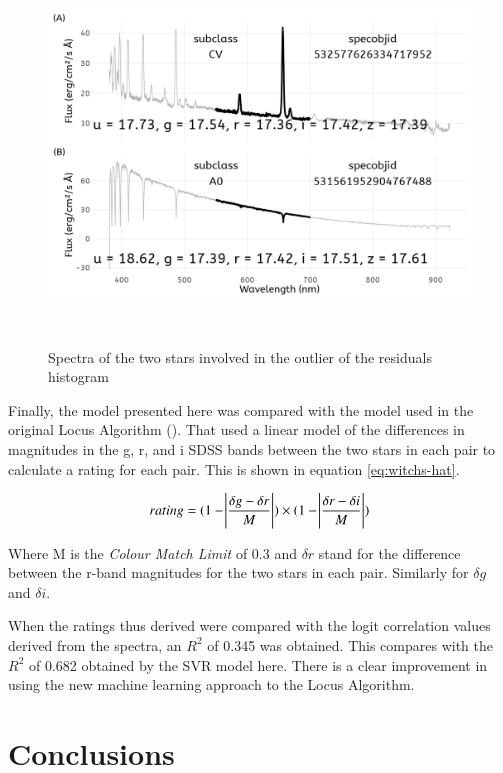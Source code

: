 \documentclass[preprint, 3p,
authoryear]{elsarticle} %
\begin{document}
\begin{figure}
  \centering
  \includegraphics[width=\columnwidth, height = 10cm, width = 10cm]{figures/outlier-spectra}
    \caption{Spectra of the two stars involved in the outlier of the residuals histogram}
    \label{fig:outlier-spectra}
\end{figure}

Finally, the model presented here was compared with the model used in
the original Locus Algorithm (\citet{Creaner2021}). That used a linear
model of the differences in magnitudes in the g, r, and i SDSS bands
between the two stars in each pair to calculate a rating for each pair.
This is shown in equation \ref{eq:witchs-hat}.

\begin{equation}
rating =(1- \abs{\frac{\delta g - \delta r}{M}}) \times (1-\abs{\frac{\delta r - \delta i}{M}})
  \label{eq:witchs-hat}
\end{equation}

Where M is the \emph{Colour Match Limit} of 0.3 and \(\delta r\) stand
for the difference between the r-band magnitudes for the two stars in
each pair. Similarly for \(\delta g\) and \(\delta i\).

When the ratings thus derived were compared with the logit correlation
values derived from the spectra, an \(R^2\) of 0.345 was obtained. This
compares with the \(R^2\) of 0.682 obtained by the SVR model here. There
is a clear improvement in using the new machine learning approach to the
Locus Algorithm.

\hypertarget{conclusions}{%
\section{Conclusions}\label{conclusions}}
\end{document}
